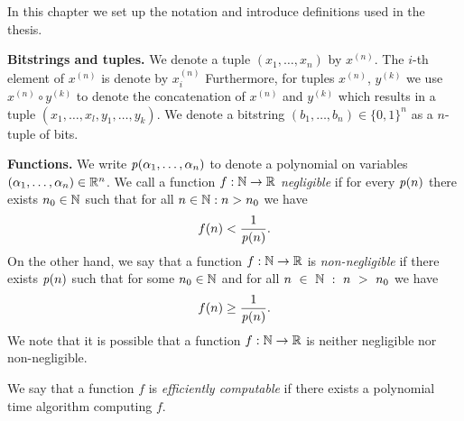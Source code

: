 %
In this chapter we set up the notation and introduce definitions used in the thesis.


\textbf{Bitstrings and tuples.}
We denote a tuple $(x_1, \dotsc, x_n)$ by $x^{(n)}$. The $i$-th element of $x^{(n)}$ is denote by $x^{(n)}_i$
Furthermore, for tuples $x^{(n)}$, $y^{(k)}$ we use $x^{(n)} \circ y^{(k)}$ to denote the concatenation of $x^{(n)}$ and $y^{(k)}$ which results in
a tuple $(x_1, \dotsc, x_l, y_1, \dotsc, y_k)$.
We denote a bitstring $(b_1, \dotsc, b_n) \in \{0,1\}^{n}$ as a $n$-tuple of bits.

\textbf{Functions.}
We write $\operatorname{\mathit{p}}(\alpha_1, \dots, \alpha_n)$ to denote a polynomial on variables $(\alpha_1, \dots, \alpha_n) \in \mathbb{R}^n$.
We call a function $f: \mathbb{N} \rightarrow \mathbb{R}$ \textit{negligible} if for every $\operatorname{\mathit{p}}(n)$
there exists $n_0 \in \mathbb{N}$ such that for all $n \in \mathbb{N} : n > n_0$ we have
\begin{align*}
f(n) < \frac{1}{\operatorname{\mathit{p}}(n)}.
\end{align*}
On the other hand, we say that a function $f: \mathbb{N} \rightarrow \mathbb{R}$ is \textit{non-negligible} if
there exists $\operatorname{\mathit{p}}(n)$ such that for some $n_0 \in \mathbb{N}$ and for all $n~\in~\mathbb{N}~:~n~>~n_0$ we have
\begin{align*}
  f(n) \geq \frac{1}{\operatorname{\mathit{p}}(n)}.
\end{align*}
We note that it is possible that a function $f:\mathbb{N} \rightarrow \mathbb{R}$ is neither negligible nor non-negligible.

We say that a function $f$ is \textit{efficiently computable} if there exists a polynomial time algorithm computing $f$.

